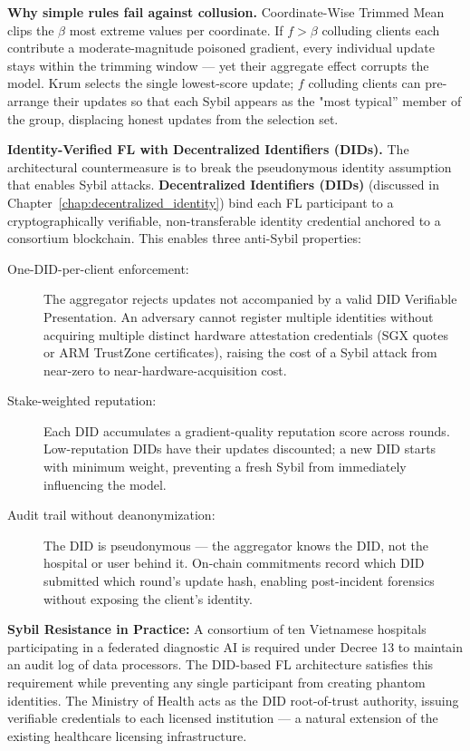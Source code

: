 \textbf{Why simple rules fail against collusion.} Coordinate-Wise Trimmed Mean clips the $\beta$ most extreme values per coordinate. If $f > \beta$ colluding clients each contribute a moderate-magnitude poisoned gradient, every individual update stays within the trimming window — yet their aggregate effect corrupts the model. Krum selects the single lowest-score update; $f$ colluding clients can pre-arrange their updates so that each Sybil appears as the "most typical'' member of the group, displacing honest updates from the selection set.

\textbf{Identity-Verified FL with Decentralized Identifiers (DIDs).} The architectural countermeasure is to break the pseudonymous identity assumption that enables Sybil attacks. \textbf{Decentralized Identifiers (DIDs)} (discussed in Chapter~\ref{chap:decentralized_identity}) bind each FL participant to a cryptographically verifiable, non-transferable identity credential anchored to a consortium blockchain. This enables three anti-Sybil properties:

\begin{description}
  \item[One-DID-per-client enforcement:] The aggregator rejects updates not accompanied by a valid DID Verifiable Presentation. An adversary cannot register multiple identities without acquiring multiple distinct hardware attestation credentials (SGX quotes or ARM TrustZone certificates), raising the cost of a Sybil attack from near-zero to near-hardware-acquisition cost.
  \item[Stake-weighted reputation:] Each DID accumulates a gradient-quality reputation score across rounds. Low-reputation DIDs have their updates discounted; a new DID starts with minimum weight, preventing a fresh Sybil from immediately influencing the model.
  \item[Audit trail without deanonymization:] The DID is pseudonymous — the aggregator knows the DID, not the hospital or user behind it. On-chain commitments record which DID submitted which round's update hash, enabling post-incident forensics without exposing the client's identity.
\end{description}

\begin{svgraybox}
\textbf{Sybil Resistance in Practice:} A consortium of ten Vietnamese hospitals participating in a federated diagnostic AI is required under Decree 13 to maintain an audit log of data processors. The DID-based FL architecture satisfies this requirement while preventing any single participant from creating phantom identities. The Ministry of Health acts as the DID root-of-trust authority, issuing verifiable credentials to each licensed institution --- a natural extension of the existing healthcare licensing infrastructure.
\end{svgraybox}

